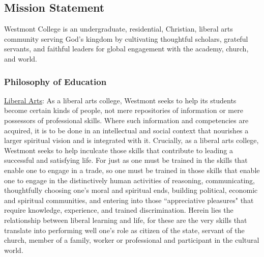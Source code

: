 \documentclass[letterpaper, 11pt]{article}
\begin{document}
\subsection{Mission Statement}
   Westmont College is an undergraduate, residential, Christian, liberal arts community serving God's kingdom by cultivating thoughtful scholars, grateful servants, and faithful leaders for global engagement with the academy, church, and world.
\subsubsection{Philosophy of Education}

\underline {Liberal Arts}: As a liberal arts college, Westmont seeks to help its students become certain kinds of people, not mere repositories of information or mere possessors of professional skills.  Where such information and competencies are acquired, it is to be done in an intellectual and social context that nourishes a larger spiritual vision and is integrated with it.  Crucially, as a liberal arts college, Westmont seeks to help inculcate those skills that contribute to leading a successful and satisfying life.  For just as one must be trained in the skills that enable one to engage in a trade, so one must be trained in those skills that enable one to engage in the distinctively human activities of reasoning, communicating, thoughtfully choosing one's moral and spiritual ends, building political, economic and spiritual communities, and entering into those ``appreciative pleasures" that require knowledge, experience, and trained discrimination. Herein lies the relationship between liberal learning and life, for these are the very skills that translate into performing well one's role as citizen of the state, servant of the church, member of a family, worker or professional and participant in the cultural world.
\end{document}
